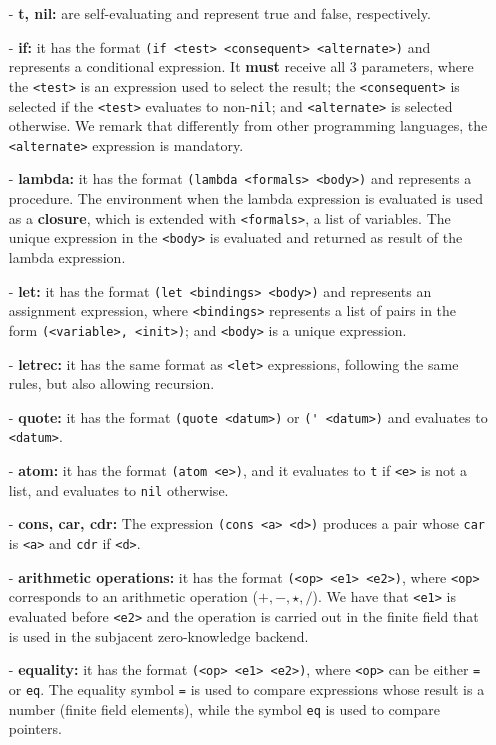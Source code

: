 \documentclass[10pt, english]{article}
\begin{document}
\begin{itemize}
  \item[-] \textbf{t, nil:} are self-evaluating and represent true and false, respectively.
  \item[-] \textbf{if:} it has the format \verb|(if <test> <consequent> <alternate>)| and represents a conditional expression. It \textbf{must} receive all 3 parameters, where the \verb|<test>| is an expression used to select the result; the \verb|<consequent>| is selected if the \verb|<test>| evaluates to non-\verb|nil|; and \verb|<alternate>| is selected otherwise. We remark that differently from other programming languages, the \verb|<alternate>| expression is mandatory.
  \item[-] \textbf{lambda:} it has the format \verb|(lambda <formals> <body>)| and represents a procedure. The environment when the lambda expression is evaluated is used as a \textbf{closure}, which is extended with \verb|<formals>|, a list of variables. The unique expression in the \verb|<body>| is evaluated and returned as result of the lambda expression.
  \item[-] \textbf{let:} it has the format \verb|(let <bindings> <body>)| and represents an assignment expression, where \verb|<bindings>| represents a list of pairs in the form \verb|(<variable>, <init>)|; and \verb|<body>| is a unique expression.
  \item[-] \textbf{letrec:} it has the same format as \verb|<let>| expressions, following the same rules, but also allowing recursion.
  \item[-] \textbf{quote:} it has the format \verb|(quote <datum>)| or \verb|(' <datum>)| and evaluates to \verb|<datum>|.
  \item[-] \textbf{atom:} it has the format \verb|(atom <e>)|, and it evaluates to \verb|t| if \verb|<e>| is not a list, and evaluates to \verb|nil| otherwise.
  \item[-] \textbf{cons, car, cdr:} The expression \verb|(cons <a> <d>)| produces a pair whose \verb|car| is \verb|<a>| and \verb|cdr| if \verb|<d>|.
  \item[-] \textbf{arithmetic operations:} it has the format \verb|(<op> <e1> <e2>)|, where \verb|<op>| corresponds to an arithmetic operation ($+, -, \star, \slash$). We have that \verb|<e1>| is evaluated before \verb|<e2>| and the operation is carried out in the finite field that is used in the subjacent zero-knowledge backend.
  \item[-] \textbf{equality:} it has the format \verb|(<op> <e1> <e2>)|, where \verb|<op>| can be either \verb|=| or \verb|eq|. The equality symbol \verb|=| is used to compare expressions whose result is a number (finite field elements), while the symbol \verb|eq| is used to compare pointers.

\end{itemize}
\end{document}
